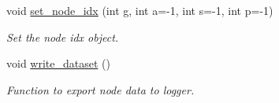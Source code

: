 \begin{DoxyCompactItemize}
void \hyperlink{classMCT__NODE_a04ad1b7ce156c2501819d32047e3e83a}{set\+\_\+node\+\_\+idx} (int g, int a=-\/1, int s=-\/1, int p=-\/1)
\begin{DoxyCompactList}\small\item\em Set the node idx object. \end{DoxyCompactList}\item 
\mbox{\label{classMCT__NODE_a411f350ef5e4d9ce85b361b6f7dfd512}} 
void \hyperlink{classMCT__NODE_a411f350ef5e4d9ce85b361b6f7dfd512}{write\+\_\+dataset} ()
\begin{DoxyCompactList}\small\item\em Function to export node data to logger. \end{DoxyCompactList}\end{DoxyCompactItemize}
